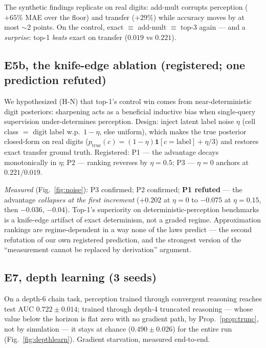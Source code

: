 \documentclass[10pt]{article}
\theoremstyle{remark}
\begin{document}
\noindent The synthetic findings replicate on real digits: add-mult corrupts perception ($+65\%$
MAE over the floor) and transfer ($+29\%$) while accuracy moves by at most $\sim$2 points. On the
control, exact $\equiv$ add-mult $\equiv$ top-3 again --- and a \emph{surprise}: top-1
\emph{beats} exact on transfer ($0.019$ vs $0.221$).

\subsection{E5b, the knife-edge ablation (registered; one prediction refuted)}

We hypothesized (H-N) that top-1's control win comes from near-deterministic digit posteriors:
sharpening acts as a beneficial inductive bias when single-query supervision under-determines
perception. Design: inject latent label noise $\eta$ (cell class $=$ digit label w.p.\ $1-\eta$,
else uniform), which makes the true posterior closed-form on real digits
($p_{\text{true}}(c) = (1-\eta)\mathbf{1}[c = \text{label}] + \eta/3$) and restores exact transfer
ground truth. Registered: P1 --- the advantage decays monotonically in $\eta$; P2 --- ranking
reverses by $\eta = 0.5$; P3 --- $\eta = 0$ anchors at $0.221/0.019$.

\emph{Measured} (Fig.~\ref{fig:noise}): P3 confirmed; P2 confirmed; \textbf{P1 refuted} --- the
advantage \emph{collapses at the first increment} ($+0.202$ at $\eta{=}0$ to $-0.075$ at
$\eta{=}0.15$, then $-0.036$, $-0.04$). Top-1's superiority on deterministic-perception
benchmarks is a knife-edge artifact of exact determinism, not a graded regime. Approximation
rankings are regime-dependent in a way none of the laws predict --- the second refutation of our
own registered prediction, and the strongest version of the ``measurement cannot be replaced by
derivation'' argument.

\subsection{E7, depth learning (3 seeds)}

On a depth-6 chain task, perception trained through convergent reasoning reaches test AUC $0.722
\pm 0.014$; trained through depth-4 truncated reasoning --- whose value below the horizon is flat
zero with no gradient path, by Prop.~\ref{prop:trunc}, not by simulation --- it stays at chance
($0.490 \pm 0.026$) for the entire run (Fig.~\ref{fig:depthlearn}). Gradient starvation,
measured end-to-end.
\end{document}
